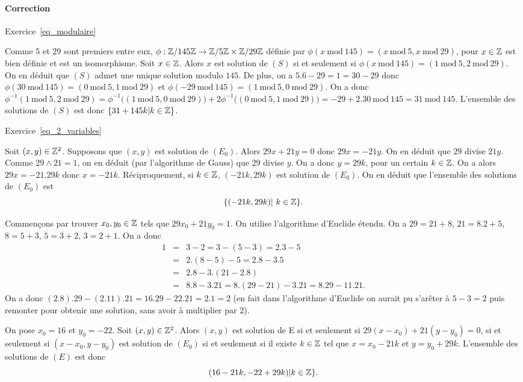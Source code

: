 \documentclass[11pt,a4paper]{article}
\begin{document}
\paragraph{Correction}

Exercice~\ref{eq_modulaire}

Comme $5$ et $29$ sont premiers entre eux, $\phi:\mathbb{Z}/145\mathbb{Z}\rightarrow \mathbb{Z}/5\mathbb{Z}\times \mathbb{Z}/29\mathbb{Z}$ définie par $\phi(x\mathrm{\ mod\ }145)=(x\mathrm{\ mod\ }5, x\mathrm{\ mod\ }29)$, pour $x\in \mathbb{Z}$ est bien définie et est un isomorphisme. Soit $x\in\mathbb{Z}$. Alors $x$ est solution de $(S)$ si et seulement si $\phi(x\mathrm{\ mod\ }145)=(1\mathrm{\ mod\ }5, 2\mathrm{\ mod\ }29)$. On en déduit que $(S)$ admet une unique solution modulo $145$. De plus, on a $5.6-29=1=30-29$ donc $\phi(30\mathrm{\ mod\ }145)=(0\mathrm{\ mod\ }5,1\mathrm{\ mod\ }29)$ et  $\phi(-29\mathrm{\ mod\ }145)=(1\mathrm{\ mod\ }5,0\mathrm{\ mod\ }29)$. On a donc $\phi^{-1}(1\mathrm{\ mod\ }5,2\mathrm{\ mod\ }29)=\phi^{-1}\big((1\mathrm{\ mod\ }5,0\mathrm{\ mod\ }29)\big)+2\phi^{-1}\big((0\mathrm{\ mod\ }5,1\mathrm{\ mod\ }29)\big)=-29+2.30\mathrm{\ mod\ 145}=31\mathrm{\ mod\ }145$. L'ensemble des solutions de $(S)$ est donc $\{31+145k|k\in \mathbb{Z}\}$.


Exercice~\ref{eq_2_variables}

Soit $(x,y)\in \mathbb{Z}^2$. Supposons que $(x,y)$ est solution de $(E_0)$. Alors $29x+21y=0$ donc $29x=-21y$. On en déduit que $29$ divise $21y$. Comme $29\wedge 21=1$, on en déduit (par l'algorithme de Gauss) que $29$ divise $y$. On a donc $y=29k$, pour un certain $k\in \mathbb{Z}$. On a alors $29x=-21.29 k$ donc $x=-21k$. Réciproquement, si $k\in \mathbb{Z}$, $(-21k,29k)$ est solution de $(E_0)$. On en déduit que l'ensemble des solutions de $(E_0)$ est \[\{(-21k,29k)|\ k\in \mathbb{Z}\}.\]

Commençons par trouver $x_0,y_0\in \mathbb{Z}$ tels que $29x_0+21y_0=1$. On utilise l'algorithme d'Euclide étendu. On a $29=21+8$, $21=8.2+5$, $8=5+3$, $5=3+2$, $3=2+1$. On a donc \[ \begin{aligned} 1 &=& 3-2=3-(5-3)=2.3-5\\
&=& 2.(8-5)-5= 2.8-3.5\\ &=& 2.8-3.(21-2.8)\\ 
&=& 8.8-3.21=8.(29-21)-3.21=8.29-11.21.\end{aligned}\] On a donc $(2.8).29-(2.11).21=16.29-22.21=2.1=2$ (en fait dans l'algorithme d'Euclide on aurait pu s'arêter à $5-3=2$ puis remonter pour obtenir une solution, sans avoir à multiplier par $2$).

On pose $x_0=16$ et $y_0=-22$. Soit $(x,y)\in \mathbb{Z}^2$. Alors $(x,y)$ est solution de E si et seulement si $29(x-x_0)+21(y-y_0)=0$, si et seulement si $(x-x_0,y-y_0)$ est solution de $(E_0)$ si et seulement si il existe $k\in \mathbb{Z}$ tel que $x=x_0-21k$ et $y=y_0+29k$. L'ensemble des solutions de $(E)$ est donc \[(16-21k,-22+29 k)| k\in \mathbb{Z}\}.\] 
\end{document}
